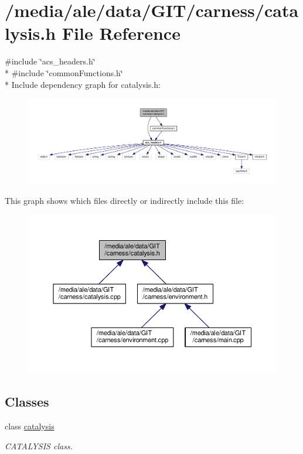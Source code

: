 \hypertarget{a00026}{\section{/media/ale/data/\-G\-I\-T/carness/catalysis.h File Reference}
\label{a00026}
}
{\ttfamily \#include \char`\"{}acs\-\_\-headers.\-h\char`\"{}}\\*
{\ttfamily \#include \char`\"{}common\-Functions.\-h\char`\"{}}\\*
Include dependency graph for catalysis.\-h\-:\nopagebreak
\begin{figure}[H]
\begin{center}
\leavevmode
\includegraphics[width=350pt]{a00053}
\end{center}
\end{figure}
This graph shows which files directly or indirectly include this file\-:\nopagebreak
\begin{figure}[H]
\begin{center}
\leavevmode
\includegraphics[width=350pt]{a00054}
\end{center}
\end{figure}
\subsection*{Classes}
\begin{DoxyCompactItemize}
\item 
class \hyperlink{a00009}{catalysis}
\begin{DoxyCompactList}\small\item\em C\-A\-T\-A\-L\-Y\-S\-I\-S class. \end{DoxyCompactList}\end{DoxyCompactItemize}
